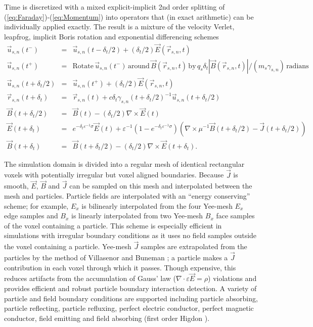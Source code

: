 \documentclass[letter,10pt]{article}
\newcommand{\eps}{\varepsilon}
\newcommand{\vecr}{\vec{r}}
\newcommand{\vecu}{\vec{u}}
\newcommand{\vecJ}{\vec{J}}
\newcommand{\vecE}{\vec{E}}
\newcommand{\vecB}{\vec{B}}
\newcommand{\Div}[1]{\nabla \cdot #1}
\newcommand{\Curl}[1]{\nabla \times #1}
\newcommand{\eq}[1]{(\ref{eq:#1})}
\begin{document}
Time is discretized with a mixed explicit-implicit 2nd order splitting of
\eq{Faraday}-\eq{Momentum} into operators that (in exact arithmetic)
can be individually applied exactly.  The result is a mixture of the
velocity Verlet, leapfrog, implicit Boris rotation and exponential differencing
schemes
\begin{eqnarray}
\vecu_{s,n}\left(t^-\right) &=&\vecu_{s,n}\left(t-\delta_t/2\right) +
  \left(\delta_t/2\right)\vecE\left(\vecr_{s,n},t\right) \\
\vecu_{s,n}\left(t^+\right) &=&
  \textrm{Rotate}\,\vecu_{s,n}\left(t^-\right)\,\textrm{around}\,
  \vecB\left(\vecr_{s,n},t\right)\,\textrm{by}\,
  q_s\delta_t\left|\vecB\left(\vecr_{s,n},t\right)\right| /
  \left(m_s\gamma_{s,n}\right)\,\textrm{radians} \\
\vecu_{s,n}\left(t+\delta_t/2\right) &=&\vecu_{s,n}\left(t^+\right) +
  \left(\delta_t/2\right)\vecE\left(\vecr_{s,n},t\right) \\
\vecr_{s,n}\left(t+\delta_t\right) &=& \vecr_{s,n}\left(t\right) +
  c\delta_t\gamma_{s,n}\left(t+\delta_t/2\right)^{-1}
           \vecu_{s,n}\left(t+\delta_t/2\right) \\
\vecB\left(t+\delta_t/2\right) &=&
  \vecB\left(t\right) -
  \left(\delta_t/2\right)\Curl{\vecE\left(t\right)} \\
\vecE\left(t+\delta_t\right) &=&
  e^{-\delta_t\eps^{-1}\sigma}\vecE\left(t\right) +
  \eps^{-1}\left(1-e^{-\delta_t\eps^{-1}\sigma}\right)
    \left( \Curl{\mu^{-1}\vecB\left(t+\delta_t/2\right)} -
           \vecJ\left(t+\delta_t/2\right) \right) \\
\vecB\left(t+\delta_t\right) &=& \vecB\left(t+\delta_t/2\right) -
  \left(\delta_t/2\right)\Curl{\vecE\left(t+\delta_t\right)}
.
\end{eqnarray}

The simulation domain is divided into a regular mesh of identical
rectangular voxels with potentially irregular but voxel aligned
boundaries.  Because $\vecJ$ is smooth, $\vecE$, $\vecB$ and $\vecJ$
can be sampled on this mesh and interpolated between the mesh and
particles.  Particle fields are interpolated with an ``energy
conserving'' scheme; for example, $E_x$ is bilinearly interpolated
from the four Yee-mesh $E_x$ edge samples and $B_x$ is linearly
interpolated from two Yee-mesh $B_x$ face samples of the voxel containing a
particle.  This scheme is especially efficient in simulations with
irregular boundary conditions as it uses no field samples outside the
voxel containing a particle.  Yee-mesh $\vecJ$ samples are
extrapolated from the particles by the method of Villasenor and
Buneman \cite{Villasenor_Buneman_1992}; a particle makes a $\vecJ$
contribution in each voxel through which it passes.  Though expensive,
this reduces artifacts from the accumulation of Gauss' law
($\Div{\eps\vecE}=\rho$) violations and provides efficient and robust
particle boundary interaction detection.  A variety of particle and
field boundary conditions are supported including particle absorbing,
particle reflecting, particle refluxing, perfect electric conductor,
perfect magnetic conductor, field emitting and field absorbing (first
order Higdon \cite{Higdon_1986}).
\end{document}

